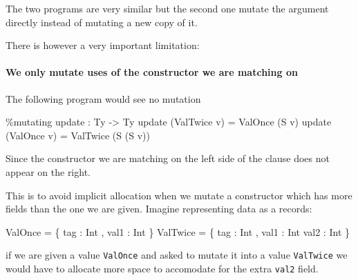 \documentclass[
]{article}
\newenvironment{Shaded}{}{}
\newcommand{\DataTypeTok}[1]{\textcolor[rgb]{0.56,0.13,0.00}{#1}}
\newcommand{\NormalTok}[1]{#1}
\newcommand{\OperatorTok}[1]{\textcolor[rgb]{0.40,0.40,0.40}{#1}}
\newcommand{\OtherTok}[1]{\textcolor[rgb]{0.00,0.44,0.13}{#1}}
\begin{document}
The two programs are very similar but the second one mutate the argument
directly instead of mutating a new copy of it.

There is however a very important limitation:

\hypertarget{we-only-mutate-uses-of-the-constructor-we-are-matching-on}{%
\paragraph{We only mutate uses of the constructor we are matching
on}\label{we-only-mutate-uses-of-the-constructor-we-are-matching-on}}

The following program would see no mutation

\begin{Shaded}
\begin{Highlighting}[]
\OperatorTok{\%}\NormalTok{mutating}
\NormalTok{update }\OperatorTok{:} \DataTypeTok{Ty} \OtherTok{{-}\textgreater{}} \DataTypeTok{Ty}
\NormalTok{update (}\DataTypeTok{ValTwice}\NormalTok{ v) }\OtherTok{=} \DataTypeTok{ValOnce}\NormalTok{ (}\DataTypeTok{S}\NormalTok{ v)}
\NormalTok{update (}\DataTypeTok{ValOnce}\NormalTok{ v) }\OtherTok{=} \DataTypeTok{ValTwice}\NormalTok{ (}\DataTypeTok{S}\NormalTok{ (}\DataTypeTok{S}\NormalTok{ v))}
\end{Highlighting}
\end{Shaded}

Since the constructor we are matching on the left side of the clause
does not appear on the right.

This is to avoid implicit allocation when we mutate a constructor which
has more fields than the one we are given. Imagine representing data as
a records:

\begin{Shaded}
\begin{Highlighting}[]
\DataTypeTok{ValOnce} \OtherTok{=}\NormalTok{ \{ tag }\OperatorTok{:} \DataTypeTok{Int}\NormalTok{ , val1 }\OperatorTok{:} \DataTypeTok{Int}\NormalTok{ \}}
\DataTypeTok{ValTwice} \OtherTok{=}\NormalTok{ \{ tag }\OperatorTok{:} \DataTypeTok{Int}\NormalTok{ , val1 }\OperatorTok{:} \DataTypeTok{Int}\NormalTok{ val2 }\OperatorTok{:} \DataTypeTok{Int}\NormalTok{ \}}
\end{Highlighting}
\end{Shaded}

if we are given a value \texttt{ValOnce} and asked to mutate it into a
value \texttt{ValTwice} we would have to allocate more space to
accomodate for the extra \texttt{val2} field.
\end{document}

